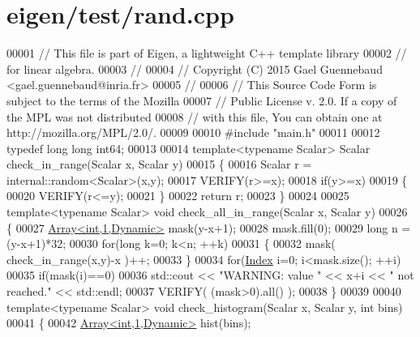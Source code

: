 \hypertarget{eigen_2test_2rand_8cpp_source}{}\section{eigen/test/rand.cpp}
\label{eigen_2test_2rand_8cpp_source}

\begin{DoxyCode}
00001 \textcolor{comment}{// This file is part of Eigen, a lightweight C++ template library}
00002 \textcolor{comment}{// for linear algebra.}
00003 \textcolor{comment}{//}
00004 \textcolor{comment}{// Copyright (C) 2015 Gael Guennebaud <gael.guennebaud@inria.fr>}
00005 \textcolor{comment}{//}
00006 \textcolor{comment}{// This Source Code Form is subject to the terms of the Mozilla}
00007 \textcolor{comment}{// Public License v. 2.0. If a copy of the MPL was not distributed}
00008 \textcolor{comment}{// with this file, You can obtain one at http://mozilla.org/MPL/2.0/.}
00009 
00010 \textcolor{preprocessor}{#include "main.h"}
00011 
00012 \textcolor{keyword}{typedef} \textcolor{keywordtype}{long} \textcolor{keywordtype}{long} int64;
00013 
00014 \textcolor{keyword}{template}<\textcolor{keyword}{typename} Scalar> Scalar check\_in\_range(Scalar x, Scalar y)
00015 \{
00016   Scalar r = internal::random<Scalar>(x,y);
00017   VERIFY(r>=x);
00018   \textcolor{keywordflow}{if}(y>=x)
00019   \{
00020     VERIFY(r<=y);
00021   \}
00022   \textcolor{keywordflow}{return} r;
00023 \}
00024 
00025 \textcolor{keyword}{template}<\textcolor{keyword}{typename} Scalar> \textcolor{keywordtype}{void} check\_all\_in\_range(Scalar x, Scalar y)
00026 \{
00027   \hyperlink{group___core___module_class_eigen_1_1_array}{Array<int,1,Dynamic>} mask(y-x+1);
00028   mask.fill(0);
00029   \textcolor{keywordtype}{long} n = (y-x+1)*32;
00030   \textcolor{keywordflow}{for}(\textcolor{keywordtype}{long} k=0; k<n; ++k)
00031   \{
00032     mask( check\_in\_range(x,y)-x )++;
00033   \}
00034   \textcolor{keywordflow}{for}(\hyperlink{namespace_eigen_a62e77e0933482dafde8fe197d9a2cfde}{Index} i=0; i<mask.size(); ++i)
00035     \textcolor{keywordflow}{if}(mask(i)==0)
00036       std::cout << \textcolor{stringliteral}{"WARNING: value "} << x+i << \textcolor{stringliteral}{" not reached."} << std::endl;
00037   VERIFY( (mask>0).all() );
00038 \}
00039 
00040 \textcolor{keyword}{template}<\textcolor{keyword}{typename} Scalar> \textcolor{keywordtype}{void} check\_histogram(Scalar x, Scalar y, \textcolor{keywordtype}{int} bins)
00041 \{
00042   \hyperlink{group___core___module_class_eigen_1_1_array}{Array<int,1,Dynamic>} hist(bins);

\end{DoxyCode}
